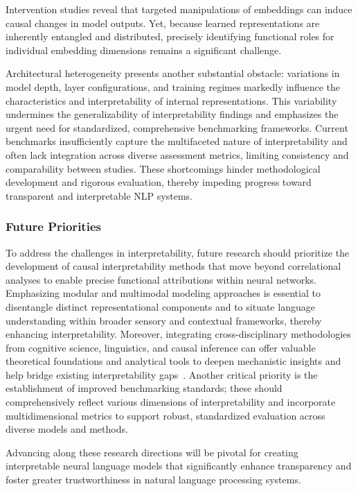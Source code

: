 \documentclass[sigconf]{acmart}
\begin{document}
Intervention studies reveal that targeted manipulations of embeddings can induce causal changes in model outputs. Yet, because learned representations are inherently entangled and distributed, precisely identifying functional roles for individual embedding dimensions remains a significant challenge.

Architectural heterogeneity presents another substantial obstacle: variations in model depth, layer configurations, and training regimes markedly influence the characteristics and interpretability of internal representations. This variability undermines the generalizability of interpretability findings and emphasizes the urgent need for standardized, comprehensive benchmarking frameworks. Current benchmarks insufficiently capture the multifaceted nature of interpretability and often lack integration across diverse assessment metrics, limiting consistency and comparability between studies. These shortcomings hinder methodological development and rigorous evaluation, thereby impeding progress toward transparent and interpretable NLP systems.

\subsubsection{Future Priorities}

To address the challenges in interpretability, future research should prioritize the development of causal interpretability methods that move beyond correlational analyses to enable precise functional attributions within neural networks. Emphasizing modular and multimodal modeling approaches is essential to disentangle distinct representational components and to situate language understanding within broader sensory and contextual frameworks, thereby enhancing interpretability. Moreover, integrating cross-disciplinary methodologies from cognitive science, linguistics, and causal inference can offer valuable theoretical foundations and analytical tools to deepen mechanistic insights and help bridge existing interpretability gaps~\cite{ref36}. Another critical priority is the establishment of improved benchmarking standards; these should comprehensively reflect various dimensions of interpretability and incorporate multidimensional metrics to support robust, standardized evaluation across diverse models and methods.

Advancing along these research directions will be pivotal for creating interpretable neural language models that significantly enhance transparency and foster greater trustworthiness in natural language processing systems.
\end{document}
